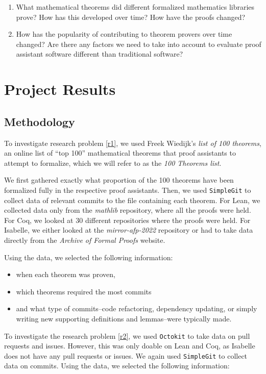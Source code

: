 \documentclass[sigconf,nonacm]{acmart}
\begin{document}
\begin{enumerate}
    \item\label{r1} What mathematical theorems did different formalized mathematics libraries prove? How has this developed over time? How have the proofs changed?
    \item\label{r2} How has the popularity of contributing to theorem provers over time changed? Are there any factors we need to take into account to evaluate proof assistant software different than traditional software?
\end{enumerate}

\section{Project Results}

\subsection{Methodology}

To investigate research problem \ref{r1}, we used Freek Wiedijk's \textit{list of 100 theorems}\cite{wiedijk}, an online list of ``top 100'' mathematical theorems that proof assistants to attempt to formalize, which we will refer to as the \textit{100 Theorems list}.

We first gathered exactly what proportion of the 100 theorems have been formalized fully in the respective proof assistants. Then, we used \texttt{SimpleGit} to collect data of relevant commits to the file containing each theorem. For Lean, we collected data only from the \textit{mathlib} repository, where all the proofs were held. For Coq, we looked at 30 different repositories where the proofs were held. For Isabelle, we either looked at the \textit{mirror-afp-2022} repository or had to take data directly from the \textit{Archive of Formal Proofs} website.

Using the data, we selected the following information:
\begin{itemize}
 \item when each theorem was proven,
 \item which theorems required the most commits
 \item and what type of commits--code refactoring, dependency updating, or simply writing new supporting definitions and lemmas--were typically made.
\end{itemize}

To investigate the research problem \ref{r2}, we used \texttt{Octokit} to take data on pull requests and issues. However, this was only doable on Lean and Coq, as Isabelle does not have any pull requests or issues. We again used \texttt{SimpleGit} to collect data on commits. Using the data, we selected the following information:
\end{document}
